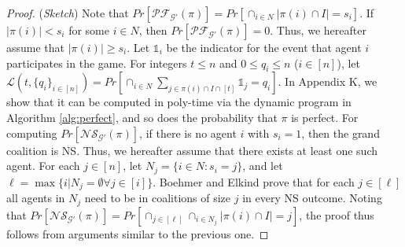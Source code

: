 \documentclass[letterpaper]{article}
\begin{document}
\begin{proof}
(\textit{Sketch}) Note that $Pr[\mathcal{PF}_{\mathcal{G}'}(\pi)] = Pr[\cap_{i \in N} |\pi(i) \cap I| = s_i]$. %
If $|\pi(i)| < s_i$ for some $i \in N$, then $Pr[\mathcal{PF}_{\mathcal{G}'}(\pi)] = 0$. Thus, we hereafter assume that $|\pi(i)| \geq s_i$. Let $\mathds{1}_i$ be the indicator for the event that agent $i$ participates in the game. For integers $t \leq n$ and $0 \leq q_i \leq n$ ($i \in [n]$), let $\mathcal{L}(t,\{q_i\}_{i \in [n]}) = Pr[\cap_{i \in N} \sum_{j \in \pi(i) \cap I \cap [t]} \mathds{1}_j = q_i]$. In Appendix K, we show that it can be computed in poly-time via the dynamic program in Algorithm \ref{alg:perfect}, and so does the probability that $\pi$ is perfect.  %
For computing $Pr[\mathcal{NS}_{\mathcal{G}'}(\pi)]$, if there is no agent $i$ with $s_i = 1$, then the grand coalition is NS. Thus, we hereafter assume that there exists at least one such agent. For each $j \in [n]$, let $N_j = \{i \in N : s_i = j\}$, and let $\ell = \max\{i | N_j = \emptyset \forall j \in [i]\}$. Boehmer and Elkind  prove that for each $j \in [\ell]$ all agents in $N_j$ need to be in coalitions of size $j$ in every NS outcome. Noting that $Pr[\mathcal{NS}_{\mathcal{G}'}(\pi)] = Pr[\cap_{j \in [\ell]} \cap_{i \in N_j} |\pi(i) \cap I| = j]$, the proof thus follows from arguments similar to the previous one.
\end{proof}
\end{document}
